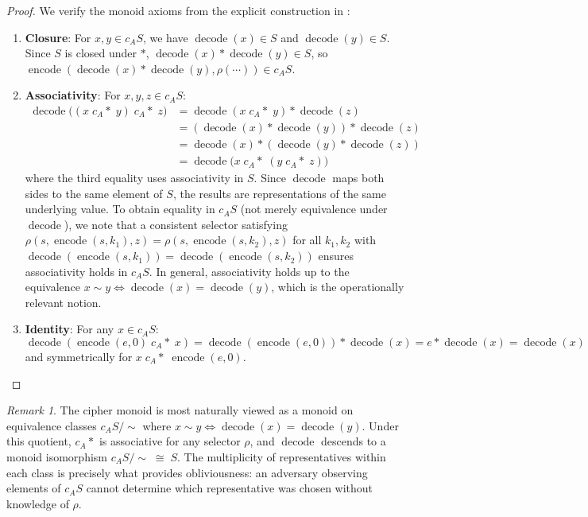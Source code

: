 \documentclass[11pt]{article}
\theoremstyle{definition}
\theoremstyle{plain}
\theoremstyle{remark}
\newtheorem{remark}{Remark}[section]
\newcommand{\cipher}[1]{c_{#1}}
\newcommand{\encode}{\operatorname{encode}}
\newcommand{\decode}{\operatorname{decode}}
\begin{document}
\begin{proof}
We verify the monoid axioms from the explicit construction in :
\begin{enumerate}
\item \textbf{Closure}: For $x, y \in \cipher{A}S$, we have $\decode(x) \in S$ and $\decode(y) \in S$. Since $S$ is closed under $*$, $\decode(x) * \decode(y) \in S$, so $\encode(\decode(x) * \decode(y), \rho(\cdots)) \in \cipher{A}S$.

\item \textbf{Associativity}: For $x,y,z \in \cipher{A}S$:
\begin{align*}
\decode\!\big((x \;\cipher{A}*\; y) \;\cipher{A}*\; z\big)
  &= \decode(x \;\cipher{A}*\; y) * \decode(z) \\
  &= (\decode(x) * \decode(y)) * \decode(z) \\
  &= \decode(x) * (\decode(y) * \decode(z)) \\
  &= \decode\!\big(x \;\cipher{A}*\; (y \;\cipher{A}*\; z)\big)
\end{align*}
where the third equality uses associativity in $S$. Since $\decode$ maps both sides to the same element of $S$, the results are representations of the same underlying value. To obtain equality in $\cipher{A}S$ (not merely equivalence under $\decode$), we note that a consistent selector satisfying $\rho(s, \encode(s, k_1), z) = \rho(s, \encode(s, k_2), z)$ for all $k_1, k_2$ with $\decode(\encode(s,k_1)) = \decode(\encode(s,k_2))$ ensures associativity holds in $\cipher{A}S$.  In general, associativity holds up to the equivalence $x \sim y \iff \decode(x) = \decode(y)$, which is the operationally relevant notion.

\item \textbf{Identity}: For any $x \in \cipher{A}S$:
$$\decode(\encode(e,0) \;\cipher{A}*\; x) = \decode(\encode(e,0)) * \decode(x) = e * \decode(x) = \decode(x)$$
and symmetrically for $x \;\cipher{A}*\; \encode(e,0)$.
\end{enumerate}
\end{proof}

\begin{remark}
The cipher monoid is most naturally viewed as a monoid on equivalence classes $\cipher{A}S / {\sim}$ where $x \sim y \iff \decode(x) = \decode(y)$.  Under this quotient, $\cipher{A}*$ is associative for any selector $\rho$, and $\decode$ descends to a monoid isomorphism $\cipher{A}S/{\sim} \;\cong\; S$.  The multiplicity of representatives within each class is precisely what provides obliviousness: an adversary observing elements of $\cipher{A}S$ cannot determine which representative was chosen without knowledge of $\rho$.
\end{remark}
\end{document}
